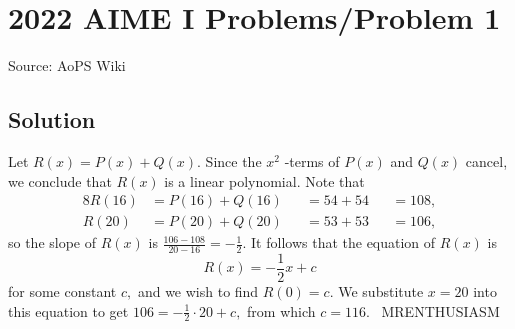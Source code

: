 \documentclass[12pt]{article}
\begin{document}
\section*{{2022 AIME I Problems/Problem 1}}
Source: AoPS Wiki

\subsection*{Solution}
Let $R(x)=P(x)+Q(x).$ Since the $x^2$ -terms of $P(x)$ and $Q(x)$ cancel, we conclude that $R(x)$ is a linear polynomial. Note that \begin{alignat*}{8} R(16) &= P(16)+Q(16) &&= 54+54 &&= 108, \\ R(20) &= P(20)+Q(20) &&= 53+53 &&= 106, \end{alignat*} so the slope of $R(x)$ is $\frac{106-108}{20-16}=-\frac12.$ It follows that the equation of $R(x)$ is \[R(x)=-\frac12x+c\] for some constant $c,$ and we wish to find $R(0)=c.$ We substitute $x=20$ into this equation to get $106=-\frac12\cdot20+c,$ from which $c=\boxed{116}.$ ~MRENTHUSIASM
\end{document}
